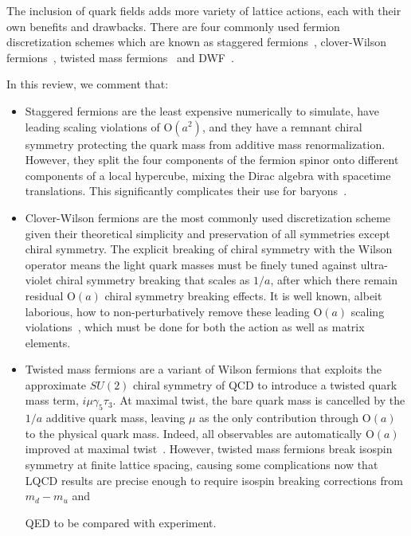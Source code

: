 \documentclass{ar-1col}
\def\g{\gamma}
\begin{document}
The inclusion of quark fields adds more variety of lattice actions, each with their own benefits and drawbacks.
There are four commonly used fermion discretization schemes which are known as staggered fermions~\cite{Kogut:1974ag,Banks:1975gq,Banks:1976ia,Susskind:1976jm}, clover-Wilson fermions~\cite{Sheikholeslami:1985ij}, twisted mass fermions~\cite{Frezzotti:2000nk} and DWF~\cite{Kaplan:1992bt,Shamir:1993zy,Furman:1994ky}.%
\begin{marginnote}
\end{marginnote}%
In this review, we comment that:
\begin{itemize}[leftmargin=*]
\item Staggered fermions are the least expensive numerically to simulate, have leading scaling violations of $\mathrm{O}(a^2)$, and they have a remnant chiral symmetry protecting the quark mass from additive mass renormalization.  However, they split the four components of the fermion spinor onto different components of a local hypercube, mixing the Dirac algebra with spacetime translations.  This significantly complicates their use for baryons~\cite{Golterman:1984dn,Bailey:2006zn,Lin:2019pia}.

\item Clover-Wilson fermions are the most commonly used discretization scheme given their theoretical simplicity and preservation of all symmetries except chiral symmetry.  The explicit breaking of chiral symmetry with the Wilson operator means the light quark masses must be finely tuned against ultra-violet chiral symmetry breaking that scales as $1/a$, after which there remain residual $\mathrm{O}(a)$ chiral symmetry breaking effects.  It is well known, albeit laborious, how to non-perturbatively remove these leading $\mathrm{O}(a)$ scaling violations~\cite{Luscher:1996sc,Luscher:1996ug,Luscher:1996jn,Capitani:1998mq}, which must be done for both the action as well as matrix elements.

\item Twisted mass fermions are a variant of Wilson fermions that exploits the approximate $SU(2)$ chiral symmetry of QCD to introduce a twisted quark mass term, $i\mu\g_5 \tau_3$.  At maximal twist, the bare quark mass is cancelled by the $1/a$ additive quark mass, leaving $\mu$ as the only contribution through $\mathrm{O}(a)$ to the physical quark mass.  Indeed, all observables are automatically $\mathrm{O}(a)$ improved at maximal twist~\cite{Frezzotti:2003ni}.
However, twisted mass fermions break isospin symmetry at finite lattice spacing, causing some complications now that LQCD results are precise enough to require isospin breaking corrections from $m_d-m_u$ and%
\begin{marginnote}
\end{marginnote}%
QED to be compared with experiment.


\end{itemize}
\end{document}
